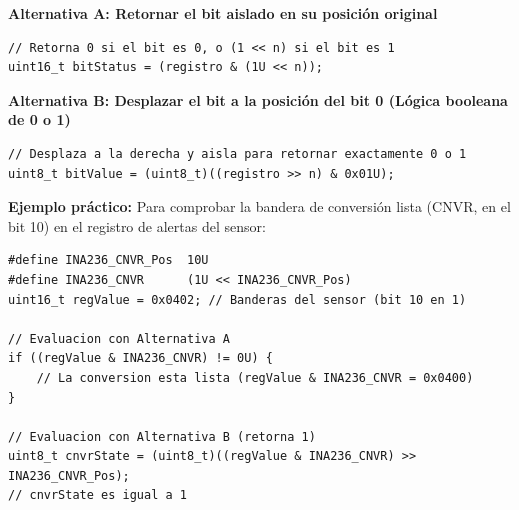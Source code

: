 \documentclass[
10pt, %
a4paper, %
oneside, %
headinclude,footinclude, %
BCOR5mm, %
]{scrartcl}
\begin{document}
\textbf{Alternativa A: Retornar el bit aislado en su posición original}
\begin{lstlisting}[style=CMakeStyle]
// Retorna 0 si el bit es 0, o (1 << n) si el bit es 1
uint16_t bitStatus = (registro & (1U << n));
\end{lstlisting}

\textbf{Alternativa B: Desplazar el bit a la posición del bit 0 (Lógica booleana de 0 o 1)}
\begin{lstlisting}[style=CMakeStyle]
// Desplaza a la derecha y aisla para retornar exactamente 0 o 1
uint8_t bitValue = (uint8_t)((registro >> n) & 0x01U);
\end{lstlisting}

\textbf{Ejemplo práctico:}
Para comprobar la bandera de conversión lista (CNVR, en el bit 10) en el registro de alertas del sensor:
\begin{lstlisting}[style=CMakeStyle]
#define INA236_CNVR_Pos  10U
#define INA236_CNVR      (1U << INA236_CNVR_Pos)
uint16_t regValue = 0x0402; // Banderas del sensor (bit 10 en 1)

// Evaluacion con Alternativa A
if ((regValue & INA236_CNVR) != 0U) {
    // La conversion esta lista (regValue & INA236_CNVR = 0x0400)
}

// Evaluacion con Alternativa B (retorna 1)
uint8_t cnvrState = (uint8_t)((regValue & INA236_CNVR) >> INA236_CNVR_Pos);
// cnvrState es igual a 1
\end{lstlisting}




%


\end{document}

